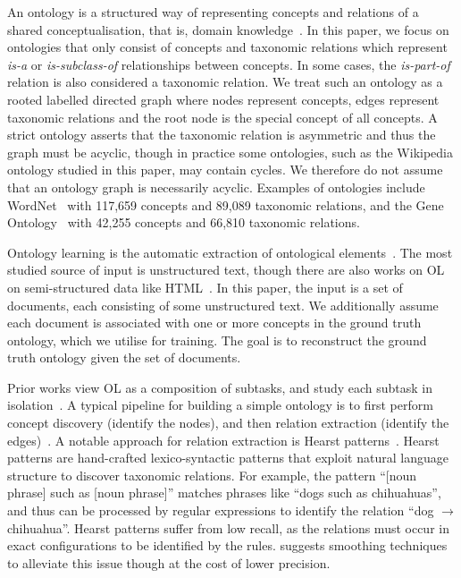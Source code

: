 \documentclass{article}
\begin{document}
An ontology is a structured way of representing concepts and relations of a shared conceptualisation, that is, domain knowledge~\cite{gruber1995toward,gruber1993translation}. In this paper, we focus on ontologies that only consist of concepts and taxonomic relations which represent \emph{is-a} or \emph{is-subclass-of} relationships between concepts. In some cases, the \emph{is-part-of} relation is also considered a taxonomic relation. We treat such an ontology as a rooted labelled directed graph where nodes represent concepts, edges represent taxonomic relations and the root node is the special concept of all concepts. A strict ontology asserts that the taxonomic relation is asymmetric and thus the graph must be acyclic, though in practice some ontologies, such as the Wikipedia ontology studied in this paper, may contain cycles. We therefore do not assume that an ontology graph is necessarily acyclic. Examples of ontologies include WordNet~\cite{miller1995wordnet} with 117,659 concepts and 89,089 taxonomic relations, and the Gene Ontology~\cite{ashburner2000gene} with 42,255 concepts and 66,810 taxonomic relations.

Ontology learning is the automatic extraction of ontological elements~\cite{hazman2011survey}. The most studied source of input is unstructured text, though there are also works on OL on semi-structured data like HTML~\cite{karoui2004ontology}. In this paper, the input is a set of documents, each consisting of some unstructured text. We additionally assume each document is associated with one or more concepts in the ground truth ontology, which we utilise for training. The goal is to reconstruct the ground truth ontology given the set of documents.%

Prior works view OL as a composition of subtasks, and study each subtask in isolation~\cite{buitelaar2005ontology,asim2018survey}. A typical pipeline for building a simple ontology is to first perform concept discovery (identify the nodes), and then relation extraction (identify the edges)~\cite{cimiano2005text2onto,kaushik2018automatic}. A notable approach for relation extraction is Hearst patterns~\cite{hearst1998automated}. Hearst patterns are hand-crafted lexico-syntactic patterns that exploit natural language structure to discover taxonomic relations. For example, the pattern ``[noun phrase] such as [noun phrase]'' matches phrases like ``dogs such as chihuahuas'', and thus can be processed by regular expressions to identify the relation ``dog $\to$ chihuahua''. Hearst patterns suffer from low recall, as the relations must occur in exact configurations to be identified by the rules. \citet{roller2018hearst} suggests smoothing techniques to alleviate this issue though at the cost of lower precision.
\end{document}

